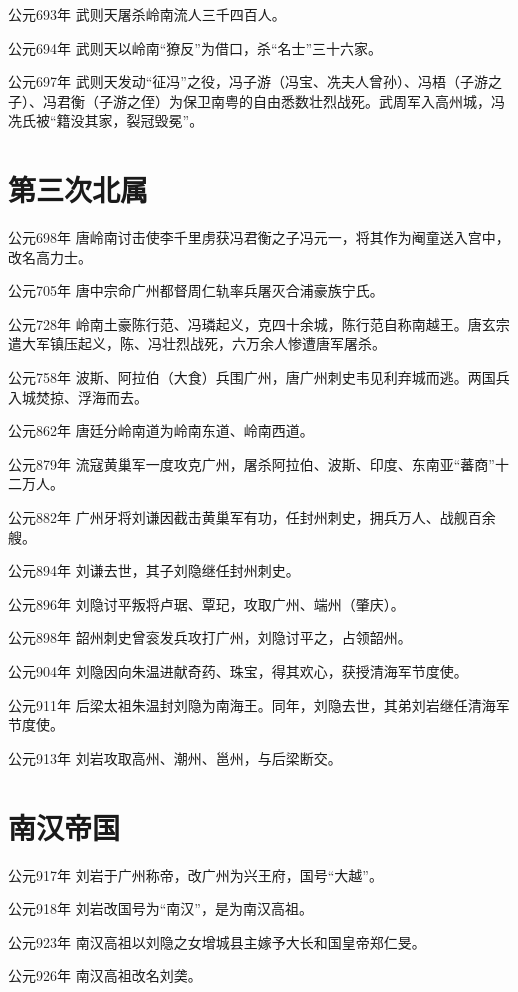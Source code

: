 公元693年 武则天屠杀岭南流人三千四百人。

公元694年 武则天以岭南“獠反”为借口，杀“名士”三十六家。

公元697年 武则天发动“征冯”之役，冯子游（冯宝、冼夫人曾孙）、冯梧（子游之子）、冯君衡（子游之侄）为保卫南粤的自由悉数壮烈战死。武周军入高州城，冯冼氏被“籍没其家，裂冠毁冕”。

\section*{第三次北属}


公元698年 唐岭南讨击使李千里虏获冯君衡之子冯元一，将其作为阉童送入宫中，改名高力士。

公元705年 唐中宗命广州都督周仁轨率兵屠灭合浦豪族宁氏。

公元728年 岭南土豪陈行范、冯璘起义，克四十余城，陈行范自称南越王。唐玄宗遣大军镇压起义，陈、冯壮烈战死，六万余人惨遭唐军屠杀。

公元758年 波斯、阿拉伯（大食）兵围广州，唐广州刺史韦见利弃城而逃。两国兵入城焚掠、浮海而去。

公元862年 唐廷分岭南道为岭南东道、岭南西道。

公元879年 流寇黄巢军一度攻克广州，屠杀阿拉伯、波斯、印度、东南亚“蕃商”十二万人。

公元882年 广州牙将刘谦因截击黄巢军有功，任封州刺史，拥兵万人、战舰百余艘。

公元894年 刘谦去世，其子刘隐继任封州刺史。

公元896年 刘隐讨平叛将卢琚、覃玘，攻取广州、端州（肇庆）。

公元898年 韶州刺史曾衮发兵攻打广州，刘隐讨平之，占领韶州。

公元904年 刘隐因向朱温进献奇药、珠宝，得其欢心，获授清海军节度使。

公元911年 后梁太祖朱温封刘隐为南海王。同年，刘隐去世，其弟刘岩继任清海军节度使。

公元913年 刘岩攻取高州、潮州、邕州，与后梁断交。

\section*{南汉帝国}

公元917年 刘岩于广州称帝，改广州为兴王府，国号“大越”。

公元918年 刘岩改国号为“南汉”，是为南汉高祖。

公元923年 南汉高祖以刘隐之女增城县主嫁予大长和国皇帝郑仁旻。

公元926年 南汉高祖改名刘䶮。

